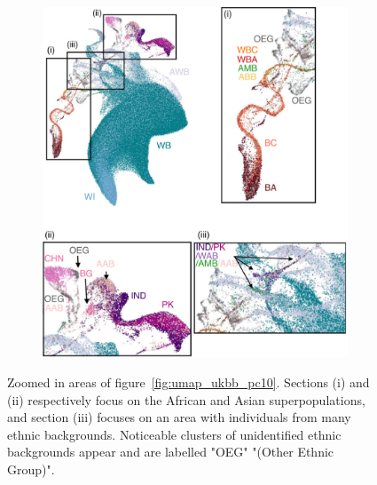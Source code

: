\documentclass[12pt]{pnas-new}
\begin{document}
\begin{figure}
    \centering
    \begin{subfigure}{0.8\textwidth}
    \includegraphics[width=\textwidth]{images/UKBB_UMAP_PC10_NN15_MD05_eth_combined_resized.pdf}
    \end{subfigure}
    \caption{Zoomed in areas of figure~\ref{fig:umap_ukbb_pc10}. Sections (i) and (ii) respectively focus on the African and Asian superpopulations, and section (iii) focuses on an area with individuals from many ethnic backgrounds. Noticeable clusters of unidentified ethnic backgrounds appear and are labelled "OEG" "(Other Ethnic Group)".}
    \label{fig:supp_ukbb_zoom}
\end{figure}
\end{document}
